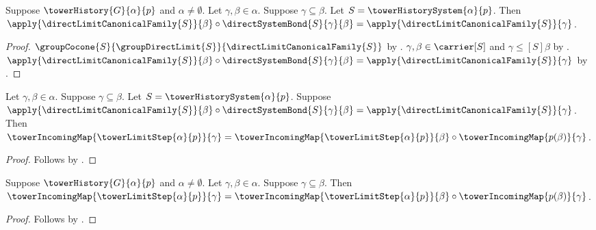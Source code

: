 \begin{proposition}\label{tower_history_canonical_family_compatibility}
    Suppose $\towerHistory{G}{\alpha}{p}$ and
        $\alpha\neq\emptyset$.
    Let $\gamma,\beta\in\alpha$.
    Suppose $\gamma\subseteq\beta$.
    Let $S=\towerHistorySystem{\alpha}{p}$.
    Then $\apply{\directLimitCanonicalFamily{S}}{\beta}\circ
            \directSystemBond{S}{\gamma}{\beta}
        =\apply{\directLimitCanonicalFamily{S}}{\gamma}$.
\end{proposition}
\begin{proof}
    $\groupCocone
        {S}{\groupDirectLimit{S}}{\directLimitCanonicalFamily{S}}$ by
        .
    $\gamma,\beta\in\carrier[S]$ and
        $\gamma\mathrel{\leq[S]}\beta$ by
        .
    $\apply{\directLimitCanonicalFamily{S}}{\beta}\circ
            \directSystemBond{S}{\gamma}{\beta}
        =\apply{\directLimitCanonicalFamily{S}}{\gamma}$ by
        .
\end{proof}

\begin{proposition}\label{tower_limit_step_coherence_bridge}
    Let $\gamma,\beta\in\alpha$.
    Suppose $\gamma\subseteq\beta$.
    Let $S=\towerHistorySystem{\alpha}{p}$.
    Suppose $\apply{\directLimitCanonicalFamily{S}}{\beta}\circ
            \directSystemBond{S}{\gamma}{\beta}
        =\apply{\directLimitCanonicalFamily{S}}{\gamma}$.
    Then $\towerIncomingMap{\towerLimitStep{\alpha}{p}}{\gamma}=
        \towerIncomingMap{\towerLimitStep{\alpha}{p}}{\beta}\circ
            \towerIncomingMap{p(\beta)}{\gamma}$.
\end{proposition}
\begin{proof}
    Follows by
        .
\end{proof}

\begin{proposition}\label{tower_limit_step_coherence}
    Suppose $\towerHistory{G}{\alpha}{p}$ and
        $\alpha\neq\emptyset$.
    Let $\gamma,\beta\in\alpha$.
    Suppose $\gamma\subseteq\beta$.
    Then $\towerIncomingMap{\towerLimitStep{\alpha}{p}}{\gamma}=
        \towerIncomingMap{\towerLimitStep{\alpha}{p}}{\beta}\circ
            \towerIncomingMap{p(\beta)}{\gamma}$.
\end{proposition}
\begin{proof}
    Follows by
        .
\end{proof}

